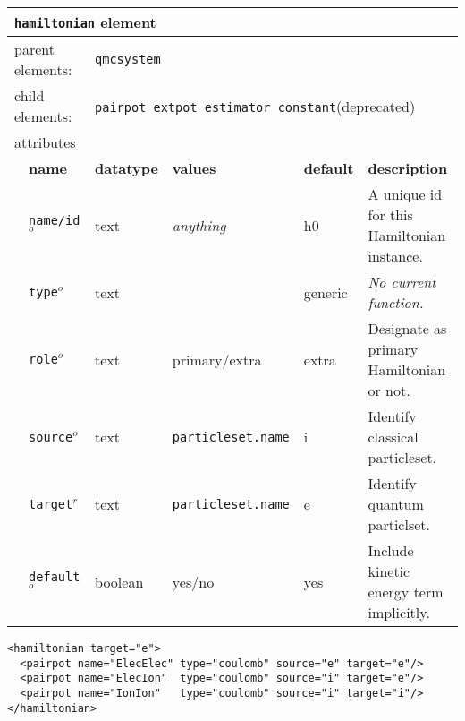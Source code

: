 \FloatBarrier
\begin{table}[h]
\begin{center}
\begin{tabularx}{\textwidth}{l l l l l l }
\hline
\multicolumn{6}{l}{\texttt{hamiltonian} element} \\
\hline
\multicolumn{2}{l}{parent elements:} & \multicolumn{4}{l}{\texttt{qmcsystem}}\\
\multicolumn{2}{l}{child  elements:} & \multicolumn{4}{l}{\texttt{pairpot extpot estimator constant}(deprecated)}\\
\multicolumn{2}{l}{attributes}  & \multicolumn{4}{l}{}\\
   &   \bfseries name     & \bfseries datatype & \bfseries values & \bfseries default   & \bfseries description \\
   &   \texttt{name/id}$^o$ &  text              & \textit{anything}& h0                  & A unique id for this Hamiltonian instance.                      \\
   &   \texttt{type}$^o$    &  text              &                  & generic             & \textit{No current function.}                      \\
   &   \texttt{role}$^o$    &  text              & primary/extra    & extra               & Designate as primary Hamiltonian or not.                      \\
   &   \texttt{source}$^o$  &  text              & \texttt{particleset.name} & i          & Identify classical particleset.                      \\
   &   \texttt{target}$^r$  &  text              & \texttt{particleset.name} & e          & Identify quantum particlset.                      \\
   &   \texttt{default}$^o$ &  boolean           & yes/no           & yes                 & Include kinetic energy term implicitly.                      \\
  \hline
\end{tabularx}
\end{center}
\end{table}
\FloatBarrier

\begin{lstlisting}[caption=All electron Hamiltonian XML element.]
<hamiltonian target="e">
  <pairpot name="ElecElec" type="coulomb" source="e" target="e"/>
  <pairpot name="ElecIon"  type="coulomb" source="i" target="e"/>
  <pairpot name="IonIon"   type="coulomb" source="i" target="i"/>
</hamiltonian>
\end{lstlisting}


